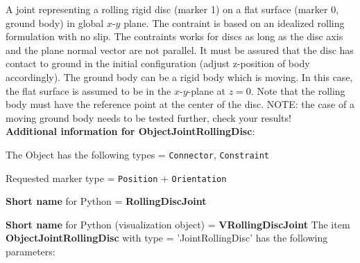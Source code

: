 %
\newpage

\label{sec:item:ObjectJointRollingDisc}
A joint representing a rolling rigid disc (marker 1) on a flat surface (marker 0, ground body) in global $x$-$y$ plane. The contraint is based on an idealized rolling formulation with no slip. The contraints works for discs as long as the disc axis and the plane normal vector are not parallel. It must be assured that the disc has contact to ground in the initial configuration (adjust z-position of body accordingly). The ground body can be a rigid body which is moving. In this case, the flat surface is assumed to be in the $x$-$y$-plane at $z=0$. Note that the rolling body must have the reference point at the center of the disc. NOTE: the case of a moving ground body needs to be tested further, check your results!\vspace{12pt}
 \\{\bf Additional information for ObjectJointRollingDisc}:
\bi
  \item The Object has the following types = \texttt{Connector}, \texttt{Constraint}
  \item Requested marker type = \texttt{Position} + \texttt{Orientation}
  \item {\bf Short name} for Python = {\bf RollingDiscJoint}  \item {\bf Short name} for Python (visualization object) = {\bf VRollingDiscJoint}\ei
\vspace{12pt} \noindent The item {\bf ObjectJointRollingDisc} with type = 'JointRollingDisc' has the following parameters:\vspace{-1cm}\\ 
